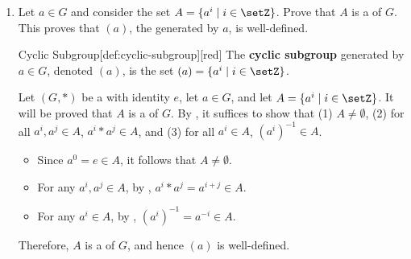 \begin{enumerate}
\begin{subprove}
    Therefore, \((H, *)\) is a , and hence a  of \((G, *)\).
  \end{subprove}
  \newpage
  \begin{define}{Exponent Notation}[def:exponent-notation][red]
    For $a \in G$, define $a^0=e$. 
    For $i \in \setZ$ with $i \geq 1$, 
    define $a^i=a * a^{i-1}$ and $a^{-i}=\left(a^{-1}\right)^i$. 
    It follows that $a^n a^m=a^{n+m}$ and $\left(a^n\right)^m=a^{n m}$ for $n, m \in \setZ$.
  \end{define}
  \item Let \(a \in G\) and consider the set \(A = \{a^{i} \mid i \in \setZ\}\).
  Prove that \(A\) is a  of \(G\).
  This proves that \((a)\), the  generated by \(a\), is well-defined.
  \begin{define}{Cyclic Subgroup}[def:cyclic-subgroup][red]
    The \textbf{cyclic subgroup} generated by \(a \in G\), denoted \((a)\), is the set \((a) = \{a^{i} \mid i \in \setZ\}\).
  \end{define}
  \begin{subprove}
    Let \((G, *)\) be a  with identity \(e\), let \(a \in G\), and let \(A = \{a^{i} \mid i \in \setZ\}\).
    It will be proved that \(A\) is a  of \(G\).
    By , it suffices to show that (1) \(A \neq \emptyset\), (2) for all \(a^{i}, a^{j} \in A\), \(a^{i} * a^{j} \in A\), and (3) for all \(a^{i} \in A\), \((a^{i})^{-1} \in A\).
    \begin{itemize}
      \item Since \(a^{0} = e \in A\), it follows that \(A \neq \emptyset\).
      \item For any \(a^{i}, a^{j} \in A\), by , \(a^{i} * a^{j} = a^{i+j} \in A\).
      \item For any \(a^{i} \in A\), by , \((a^{i})^{-1} = a^{-i} \in A\).
    \end{itemize}
    Therefore, \(A\) is a  of \(G\), and hence \((a)\) is well-defined.
  \end{subprove}
  

\end{enumerate}
